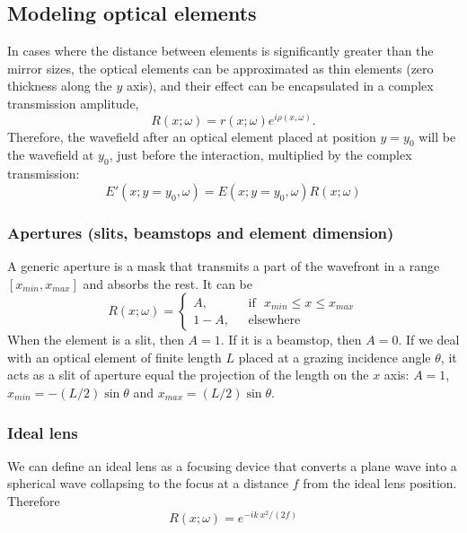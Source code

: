 \documentclass[preprint]{iucr}
\begin{document}
\subsection{Modeling optical elements}
\label{sec:elements}

In cases where the distance between elements is significantly greater than the mirror sizes, the optical elements can be approximated as thin elements (zero thickness along the $y$ axis), and their effect can be encapsulated in a complex transmission amplitude,
\begin{equation}
    \label{eq:thinelement}
    R(x;\omega)=r(x;\omega) e^{i \rho(x,\omega)}.
\end{equation}
Therefore, the wavefield after an optical element placed at position $y=y_0$ will be the wavefield at $y_0$, just before the interaction, multiplied by the complex transmission:
\begin{equation}
    E'(x;y=y_0,\omega) = E(x;y=y_0,\omega) R(x;\omega)
\end{equation}


\subsubsection{Apertures (slits, beamstops and element dimension)}
\label{sec:aperture}

A generic aperture is a mask that transmits a part of the wavefront in a range $[x_{min},x_{max}]$ and absorbs the rest. It can be
\begin{equation}
R(x;\omega) =
\left\{
\begin{matrix}
A,  & \mbox{~~if~~} x_{min} \le x \le x_{max}
\\ 
1 - A, & \mbox{~~elsewhere}
\end{matrix}
\right.
\end{equation}
When the element is a slit, then $A=1$. If it is a beamstop, then $A=0$. If we deal with an optical element of finite length $L$ placed at a grazing incidence angle $\theta$, it acts as a slit of aperture equal the projection of the length on the $x$ axis: $A=1$, $x_{min}=-(L/2) \sin \theta$ and $x_{max}=(L/2) \sin \theta$. 

\subsubsection{Ideal lens}
\label{sec:idealLens}

We can define an ideal lens as a focusing device that converts a plane wave into a spherical wave collapsing to the focus at a distance $f$ from the ideal lens position. Therefore
\begin{equation}
    R(x;\omega) = e^{-i k~x^2/(2 f)}
\end{equation}
\end{document}
